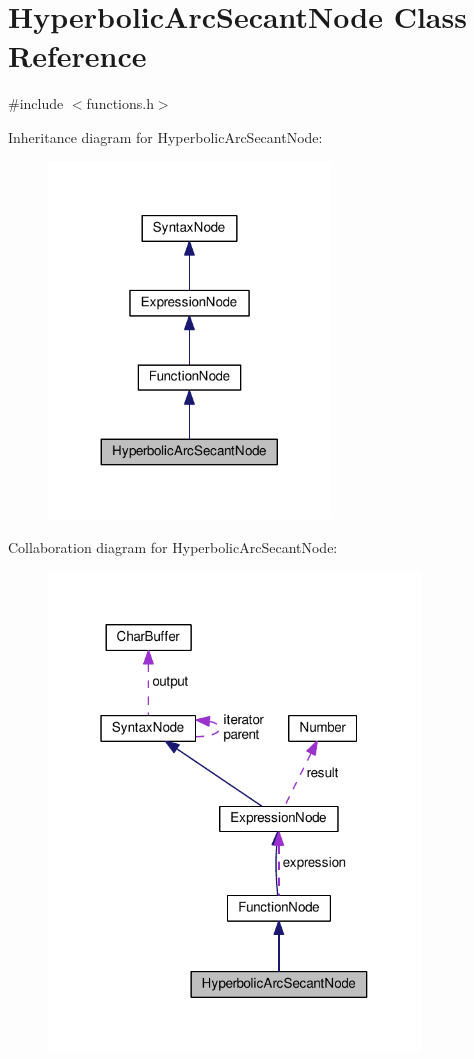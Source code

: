 \hypertarget{classHyperbolicArcSecantNode}{}\section{Hyperbolic\+Arc\+Secant\+Node Class Reference}
\label{classHyperbolicArcSecantNode}


{\ttfamily \#include $<$functions.\+h$>$}



Inheritance diagram for Hyperbolic\+Arc\+Secant\+Node\+:\nopagebreak
\begin{figure}[H]
\begin{center}
\leavevmode
\includegraphics[width=212pt]{classHyperbolicArcSecantNode__inherit__graph}
\end{center}
\end{figure}


Collaboration diagram for Hyperbolic\+Arc\+Secant\+Node\+:\nopagebreak
\begin{figure}[H]
\begin{center}
\leavevmode
\includegraphics[width=280pt]{classHyperbolicArcSecantNode__coll__graph}
\end{center}
\end{figure}
